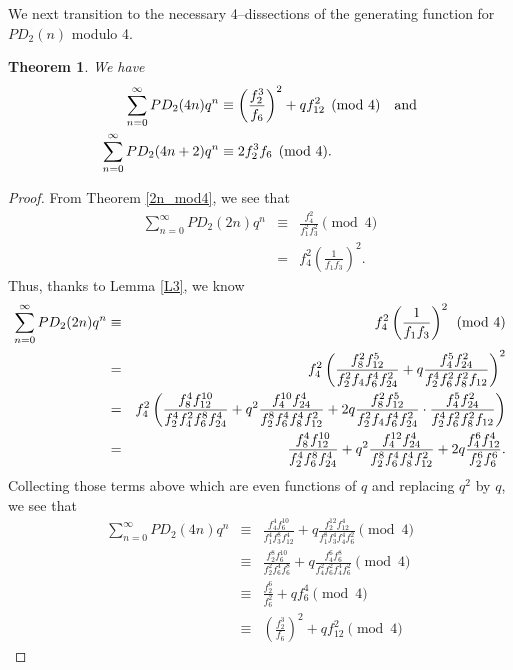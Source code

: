 \documentclass{amsart}
\newtheorem{theorem}{Theorem}[section]
\begin{document}
We next transition to the necessary 4--dissections of the generating function for $PD_2(n)$ modulo 4.  


\begin{theorem}
\label{4n_mod4}
We have
\begin{align}
\sum_{n=0}^{\infty} PD_2(4n)q^n & \equiv  \left(\frac{f_2^3}{f_6}\right)^2 +qf_{12}^2 \pmod{4}  \textrm{\ \ \ and}
\label{4diss} \\
\sum_{n=0}^{\infty} PD_2(4n+2)q^n & \equiv 2f_2^3f_6 \pmod{4}. \notag
\end{align}
\end{theorem}

\begin{proof}
From Theorem \ref{2n_mod4}, we see that 
\begin{eqnarray*}
 \sum_{n=0}^{\infty} PD_2(2n)q^{n} 
 &\equiv & \frac{f_4^2}{f_1^2f_3^2} \pmod{4} \\
 &=& f_4^2\left( \frac{1}{f_1f_3} \right)^2.
\end{eqnarray*}
Thus, thanks to Lemma \ref{L3}, we know 
\begin{eqnarray}
 \sum_{n=0}^{\infty} PD_2(2n)q^{n} 
 &\equiv & f_4^2\left( \frac{1}{f_1f_3} \right)^2 \pmod{4} \notag \\
 &=& f_4^2\left( \frac{f_8^2f_{12}^5}{f_2^2f_4f_6^4f_{24}^2} + q \frac{f_4^5f_{24}^2}{f_2^4f_6^2f_8^2f_{12}} \right)^2 \notag \\
 &=& f_4^2\left( \frac{f_8^4f_{12}^{10}}{f_2^4f_4^2f_6^8f_{24}^4} + q^2\frac{f_4^{10}f_{24}^4}{f_2^8f_6^4f_8^4f_{12}^2} + 2q\frac{f_8^2f_{12}^5}{f_2^2f_4f_6^4f_{24}^2}\cdot \frac{f_4^5f_{24}^2}{f_2^4f_6^2f_8^2f_{12}}\right)  \notag \\
 &=& \frac{f_8^4f_{12}^{10}}{f_2^4f_6^8f_{24}^4} + q^2\frac{f_4^{12}f_{24}^4}{f_2^8f_6^4f_8^4f_{12}^2} + 2q\frac{f_4^6f_{12}^4}{f_2^6f_6^6}. \label{4n0_4n2}
\end{eqnarray}
Collecting those terms above which are even functions of $q$ and replacing $q^2$ by $q$, we see that 
\begin{eqnarray*}
\sum_{n=0}^{\infty} PD_2(4n)q^n 
& \equiv & \frac{f_4^4f_{6}^{10}}{f_1^4f_3^8f_{12}^4} + q\frac{f_2^{12}f_{12}^4}{f_1^8f_3^4f_4^4f_{6}^2} \pmod{4} \\
&\equiv & 
\frac{f_2^8f_{6}^{10}}{f_2^2f_6^4f_{6}^8} + q\frac{f_4^{6}f_{6}^8}{f_4^2f_6^2f_4^4f_{6}^2} \pmod{4} \\
&\equiv & 
\frac{f_2^6}{f_6^2} + qf_{6}^4 \pmod{4} \\
&\equiv & 
\left(\frac{f_2^3}{f_6}\right)^2 +qf_{12}^2 \pmod{4} 

\end{eqnarray*}
\end{proof}
\end{document}
